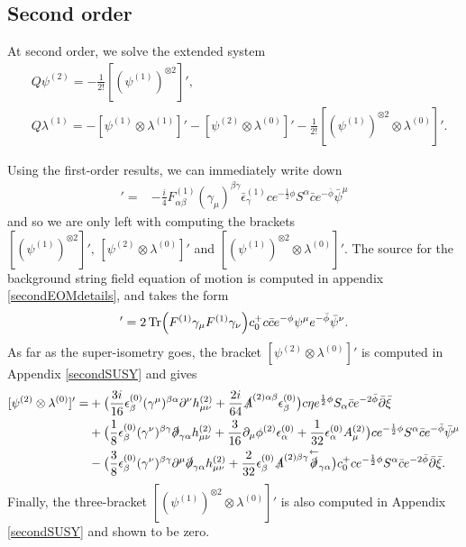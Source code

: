 \documentclass[12pt]{article}
\def\be{\begin{equation}}
\def\ee{\end{equation}}
\numberwithin{equation}{section}
\begin{document}
\subsection{Second order}
\label{secondOrd}
At second order, we solve the extended system
\be
\begin{aligned}
 &Q \psi^{(2)} = -\frac{1}{2!} [(\psi^{(1)})^{\otimes 2}]', \\
 &Q \lambda^{(1)} = -[\psi^{(1)} \otimes \lambda^{(1)}]' - [\psi^{(2)} \otimes \lambda^{(0)}]' - \frac{1}{2!} [(\psi^{(1)})^{\otimes 2} \otimes \lambda^{(0)}]'.
\end{aligned}
\ee

Using the first-order results, we can immediately write down
\begin{align}
    [\psi^{(1)} \otimes \lambda^{(1)}]' =&-\frac{i}{4} F^{(1)}_{\alpha \beta} (\gamma_\mu)^{\beta \gamma} \bar{\epsilon}^{(1)}_{\gamma}  c e^{-\frac{1}{2}\phi}S^\alpha \bar{c}e^{-\bar{\phi}}\bar{\psi}^\mu
\end{align}
and so we are only left with computing the brackets $[(\psi^{(1)})^{\otimes 2}]',\, [\psi^{(2)} \otimes \lambda^{(0)}]'$ and $[(\psi^{(1)})^{\otimes 2} \otimes \lambda^{(0)}]'$. The source for the background string field equation of motion is computed in appendix \ref{secondEOMdetails}, and takes the form
\be
[(\psi^{(1)})^{\otimes 2}]' = 2 \Tr (F^{(1)} \gamma_\mu F^{(1)} \gamma_\nu) c_0^+ c\bar{c}e^{-\phi}\psi^\mu e^{-\bar{\phi}}\bar{\psi}^\nu.
\ee
As far as the super-isometry goes, the bracket $[\psi^{(2)} \otimes \lambda^{(0)}]'$ is computed in Appendix \ref{secondSUSY} and gives
\be
\begin{aligned}
[\psi^{(2)} \otimes \lambda^{(0)}]' =
&+ \big(\frac{3i}{16} \epsilon^{(0)}_{\beta}(\gamma^\mu)^{ \beta\alpha} \partial^\nu h^{(2)}_{\mu\nu} + \frac{2 i}{64} \slashed{A}^{(2)\alpha \beta} \epsilon^{(0)}_{\beta} \big) c \eta e^{\frac{1}{2}\phi} S_\alpha \bar{c} e^{-2\bar{\phi}}\bar{\partial}\bar{\xi}  \\
& + \big( \frac{1}{8} \epsilon^{(0)}_{\beta}(\gamma^\nu)^{\beta \gamma} \slashed{\partial}_{\gamma \alpha} h^{(2)}_{\mu\nu} + \frac{3}{16} \partial_\mu \phi^{(2)} \epsilon^{(0)}_{\alpha} + \frac{1}{32} \epsilon^{(0)}_{\alpha} A^{(2)}_\mu\big) c e^{-\frac{1}{2}\phi} S^\alpha \bar{c} e^{-\bar{\phi}}\bar{\psi}^\mu \\
& -\big(\frac{3}{8}\epsilon^{(0)}_{\beta}(\gamma^\nu)^{\beta \gamma} \partial^\mu \slashed{\partial}_{ \gamma\alpha} h^{(2)}_{\mu\nu} + \frac{2}{32} \epsilon^{(0)}_{ \beta} \slashed{A}^{(2)\beta\gamma}  \overset{\leftarrow}{\slashed{\partial}}_{ \gamma \alpha} \big) c_0^+ c e^{-\frac{1}{2}\phi} S^\alpha \bar{c} e^{-2\bar{\phi}}\bar{\partial} \bar{\xi}.
\end{aligned}
\ee
Finally, the three-bracket $[(\psi^{(1)})^{\otimes2}\otimes\lambda^{(0)}]'$ is also computed in Appendix \ref{secondSUSY} and shown to be zero.
\end{document}
